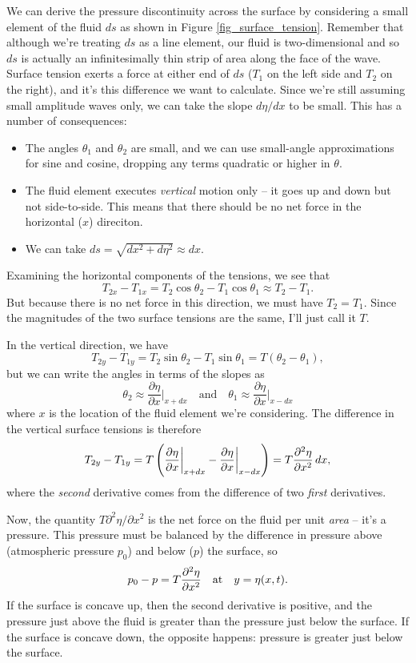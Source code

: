 We can derive the pressure discontinuity across the surface by considering a small element of the fluid $ds$ as shown in Figure \ref{fig_surface_tension}.  Remember that although we're treating $ds$ as a line element, our fluid is two-dimensional and so $ds$ is actually an infinitesimally thin strip of area along the face of the wave.  Surface tension exerts a force at either end of $ds$ ($T_1$ on the left side and  $T_2$ on the right), and it's this difference we want to calculate.  Since we're still assuming small amplitude waves only, we can take the slope $d\eta/dx$ to be small.  This has a number of consequences:
\begin{itemize}
\item The angles $\theta_1$ and $\theta_2$ are small, and we can use small-angle approximations for sine and cosine, dropping any terms quadratic or higher in $\theta$.
\item The fluid element executes \emph{vertical} motion only -- it goes up and down but not side-to-side.  This means that there should be no net force in the horizontal ($x$) direciton.
\item We can take $ds = \sqrt{dx^2 + d\eta^2} \approx dx$.
\end{itemize}

Examining the horizontal components of the tensions, we see that
\[
T_{2x} - T_{1x} = T_2 \cos\theta_2 - T_1 \cos \theta_1 \approx T_2 - T_1.
\]
But because there is no net force in this direction, we must have $T_2 = T_1$. Since the magnitudes of the two surface tensions are the same, I'll just call it $T$.

In the vertical direction, we have
\[
T_{2y} - T_{1y} = T_2 \sin\theta_2 - T_1 \sin \theta_1 = T ( \theta_2 - \theta_1),
\]
but we can write the angles in terms of the slopes as
\[
\theta_2 \approx \frac{\partial\eta}{\partial x}\bigg|_{x + dx} \quad \text{and} \quad \theta_1 \approx \frac{\partial\eta}{\partial x}\bigg|_{x - dx}
\]
where $x$ is the location of the fluid element we're considering.  The difference in the vertical surface tensions is therefore
\begin{equation}
T_{2y} - T_{1y} = T \left( \frac{\partial\eta}{\partial x}\bigg|_{x+dx} - \frac{\partial\eta}{\partial x} \bigg|_{x-dx} \right) = T \frac{\partial^2 {\eta}}{\partial {x}^2} \, dx,
\end{equation}
where the \emph{second} derivative comes from the difference of two \emph{first} derivatives.

Now, the quantity $T \partial^2\eta / \partial x^2$ is the net force on the fluid per unit \emph{area} -- it's a pressure.  This pressure must be balanced by the difference in pressure above (atmospheric pressure $p_0$) and below ($p$) the surface, so 
\begin{equation}
p_0 - p = T \frac{\partial^2 {\eta}}{\partial {x}^2} \quad \text{at} \quad y = \eta(x, t).
\end{equation}
If the surface is concave up, then the second derivative is positive, and the pressure just above the fluid is greater than the pressure just below the surface.  If the surface is concave down, the opposite happens:  pressure is greater just below the surface.

